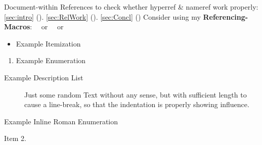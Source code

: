 

\npi%
Document-within References to check whether hyperref \& nameref work properly:\nl%
\ref{sec:intro} (). \ref{sec:RelWork}  (). \ref{sec:Concl} ()\nl%
Consider using my \textbf{Referencing-Macros}:\nl
{}\nl
\ \ or \nl
\ \ or 

\npi%
\begin{itemize}
\item%
	Example Itemization
\end{itemize}
\begin{enumerate}
\item%
	Example Enumeration
\end{enumerate}
\begin{description}
\item[Example Description List]%
	Just some random Text without any sense, but with sufficient length to cause a line-break, so that the indentation is properly showing influence.
\end{description}
\begin{enuminlrom}
\item%
	Example Inline Roman Enumeration
\item%
	Item 2.
\end{enuminlrom}

